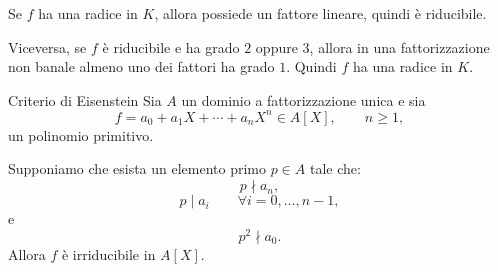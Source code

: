 \documentclass[a4paper]{article}
\begin{document}
\begin{snippetproof}{}
    Se \(f\) ha una radice in \(K\), allora possiede un fattore lineare, quindi è riducibile.

    Viceversa, se \(f\) è riducibile e ha grado \(2\) oppure \(3\), allora in una fattorizzazione non banale almeno uno dei fattori ha grado \(1\). Quindi \(f\) ha una radice in \(K\).
\end{snippetproof}

\begin{snippetproposition}{Criterio di Eisenstein}
    Sia \(A\) un dominio a fattorizzazione unica e sia
    \[
        f=a_0+a_1X+\cdots+a_nX^n\in A[X],
        \qquad
        n\geq 1,
    \]
    un polinomio primitivo.

    Supponiamo che esista un elemento primo \(p\in A\) tale che:
    \[
        p\nmid a_n,
    \]
    \[
        p\mid a_i
        \qquad
        \forall i=0,\ldots,n-1,
    \]
    e
    \[
        p^2\nmid a_0.
    \]
    Allora \(f\) è irriducibile in \(A[X]\).
\end{snippetproposition}
\end{document}
